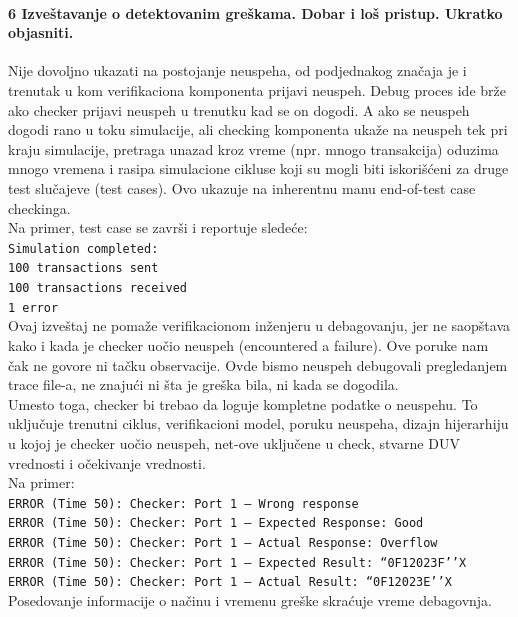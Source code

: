 \documentclass[a4paper, 12pt]{article}
\begin{document}
\paragraph{6 Izveštavanje o detektovanim greškama. Dobar i loš pristup. Ukratko objasniti.}
\hfill \break
\indent Nije dovoljno ukazati na postojanje neuspeha, od podjednakog značaja je i trenutak u kom verifikaciona komponenta prijavi neuspeh. Debug proces ide brže ako checker prijavi neuspeh u trenutku kad se on dogodi. A ako se neuspeh dogodi rano u toku simulacije, ali checking komponenta ukaže na neuspeh tek pri kraju simulacije, pretraga unazad kroz vreme (npr. mnogo transakcija) oduzima mnogo vremena i rasipa simulacione cikluse koji su mogli biti iskorišćeni za druge test slučajeve (test cases). Ovo ukazuje na inherentnu manu end-of-test case checkinga.\\
\indent Na primer, test case se završi i reportuje sledeće:\\
\texttt {Simulation completed:\\
100 transactions sent\\
100 transactions received\\
1 error\\}
\indent Ovaj izveštaj ne pomaže verifikacionom inženjeru u debagovanju, jer ne saopštava kako i kada je checker uočio neuspeh (encountered a failure). Ove poruke nam čak ne govore ni tačku observacije. Ovde bismo neuspeh debugovali pregledanjem trace file-a, ne znajući ni šta je greška bila, ni kada se dogodila.\\
\indent Umesto toga, checker bi trebao da loguje kompletne podatke o neuspehu. To uključuje trenutni ciklus, verifikacioni model, poruku neuspeha, dizajn hijerarhiju u kojoj je checker uočio neuspeh, net-ove uključene u check, stvarne DUV vrednosti i očekivanje vrednosti.\\
\indent Na primer:\\
\texttt{ERROR (Time 50): Checker: Port 1 — Wrong response\\
ERROR (Time 50): Checker: Port 1 — Expected Response: Good\\
ERROR (Time 50): Checker: Port 1 — Actual Response: Overflow\\
ERROR (Time 50): Checker: Port 1 — Expected Result: “0F12023F’’X\\
ERROR (Time 50): Checker: Port 1 — Actual Result: “0F12023E’’X\\}
\indent Posedovanje informacije o načinu i vremenu greške skraćuje vreme debagovnja.
\end{document}
